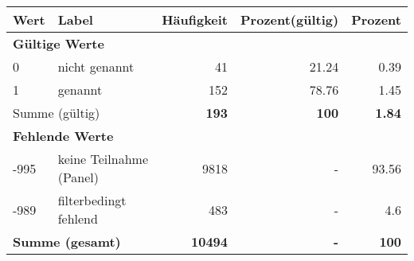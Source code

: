      \begin{longtable}{lXrrr}
     \toprule
     \textbf{Wert} & \textbf{Label} & \textbf{Häufigkeit} & \textbf{Prozent(gültig)} & \textbf{Prozent} \\
     \endhead
     \midrule
     \multicolumn{5}{l}{\textbf{Gültige Werte}}\\

     0 &
     \multicolumn{1}{X}{ nicht genannt   } &


       \num{41} &
       \num[round-mode=places,round-precision=2]{21,24} &
         \num[round-mode=places,round-precision=2]{0,39} \\

     1 &
     \multicolumn{1}{X}{ genannt   } &


       \num{152} &
       \num[round-mode=places,round-precision=2]{78,76} &
         \num[round-mode=places,round-precision=2]{1,45} \\
     \midrule
     \multicolumn{2}{l}{Summe (gültig)} &
       \textbf{\num{193}} &
     \textbf{100} &
       \textbf{\num[round-mode=places,round-precision=2]{1,84}} \\
     \multicolumn{5}{l}{\textbf{Fehlende Werte}}\\
       -995 &
       keine Teilnahme (Panel) &
         \num{9818} &
        - &
         \num[round-mode=places,round-precision=2]{93,56} \\
       -989 &
       filterbedingt fehlend &
         \num{483} &
        - &
         \num[round-mode=places,round-precision=2]{4,6} \\
     \midrule
     \multicolumn{2}{l}{\textbf{Summe (gesamt)}} &
          \textbf{\num{10494}} &
        \textbf{-} &
        \textbf{100} \\
     \bottomrule
     \end{longtable}
     
